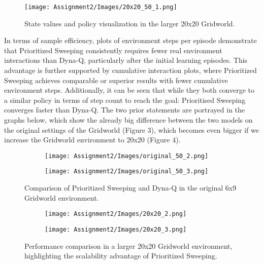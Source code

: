 \documentclass[12pt]{article}
\begin{document}
\begin{figure}[h!]
    \centering
    \texttt{[image: Assignment2/Images/20x20\_50\_1.png]}
    \caption{State values and policy visualization in the larger 20x20 Gridworld.}
    \label{fig:large_values_policy}
\end{figure}


\noindent In terms of sample efficiency, plots of environment steps per episode demonstrate that Prioritized Sweeping consistently requires fewer real environment interactions than Dyna-Q, particularly after the initial learning episodes. This advantage is further supported by cumulative interaction plots, where Prioritized Sweeping achieves comparable or superior results with fewer cumulative environment steps. Additionally, it can be seen that while they both converge to a similar policy in terms of step count to reach the goal: Prioritised Sweeping converges faster than Dyna-Q. The two prior statements are portrayed in the graphs below, which show the already big difference between the two models on the original settings of the Gridworld (Figure 3), which becomes even bigger if we increase the Gridworld environment to 20x20 (Figure 4).

\begin{figure}[htbp]
  \centering
  \begin{subfigure}[b]{0.48\textwidth}
    \centering
    \texttt{[image: Assignment2/Images/original\_50\_2.png]}
    \label{fig:original_steps_per_episode}
  \end{subfigure}
  \hfill
  \begin{subfigure}[b]{0.48\textwidth}
    \centering
    \texttt{[image: Assignment2/Images/original\_50\_3.png]}
    \label{fig:original_cumulative_steps}
  \end{subfigure}
  \caption{Comparison of Prioritized Sweeping and Dyna-Q in the original 6x9 Gridworld environment.}
  \label{fig:original_side_by_side}
\end{figure}

\begin{figure}[htbp]
  \centering
  \begin{subfigure}[b]{0.48\textwidth}
    \centering
    \texttt{[image: Assignment2/Images/20x20\_2.png]}
    \label{fig:large_steps_per_episode}
  \end{subfigure}
  \hfill
  \begin{subfigure}[b]{0.48\textwidth}
    \centering
    \texttt{[image: Assignment2/Images/20x20\_3.png]}
    \label{fig:large_cumulative_steps}
  \end{subfigure}
  \caption{Performance comparison in a larger 20x20 Gridworld environment, highlighting the scalability advantage of Prioritized Sweeping.}
  \label{fig:large_side_by_side}
\end{figure}
\end{document}
